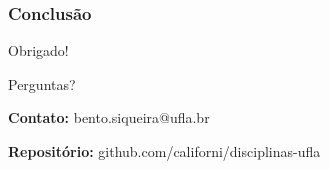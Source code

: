 \documentclass[aspectratio=169]{beamer}
\begin{document}
\begin{frame}
    \frametitle{Conclusão}
    \begin{center}
        \Huge{Obrigado!}
        
        \vspace{1em}
        \Large{Perguntas?}
        
        \vspace{2em}
        \normalsize
        \textbf{Contato:} bento.siqueira@ufla.br
        
        \textbf{Repositório:} github.com/californi/disciplinas-ufla
    \end{center}
\end{frame}
\end{document}
